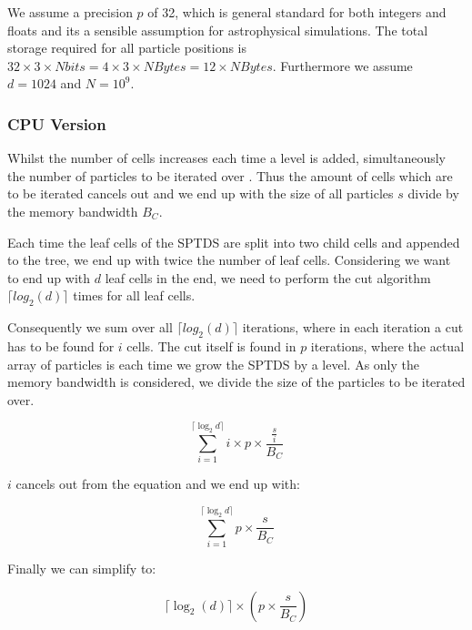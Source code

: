 \documentclass[]{article}
\begin{document}
We assume a precision $p$ of 32, which is general standard for both integers and floats and its a sensible assumption for astrophysical simulations. The total storage required for all particle positions is $32 \times 3 \times N bits = 4 \times 3 \times N Bytes = 12 \times N Bytes$. Furthermore we assume $d = 1024$ and $N=10^9$.
 
\subsubsection{CPU Version}


Whilst the number of cells increases each time a level is added, simultaneously the number of particles to be iterated over . Thus the amount of cells which are to be iterated cancels out and we end up with the size of all particles $s$ divide by the memory bandwidth $B_C$.  


Each time the leaf cells of the SPTDS are split into two child cells and appended to the tree, we end up with twice the number of leaf cells. Considering we want to end up with $d$ leaf cells in the end, we need to perform the cut algorithm $\lceil log_2(d) \rceil$ times for all leaf cells. 

Consequently we sum over all $\lceil log_2(d) \rceil$ iterations, where in each iteration a cut has to be found for $i$ cells. The cut itself is found in $p$ iterations, where the actual array of particles is each time we grow the SPTDS by a level. As only the memory bandwidth is considered, we divide the size of the particles to be iterated over.

\begin{center}
	\begin{equation}
		\sum_{i=1}^{\lceil \log_2{d} \rceil} i \times p \times  \frac{ \frac{s}{i}}{B_C} 
		\label{eq:cpu1}
	\end{equation}
\end{center}

$i$ cancels out from the equation and we end up with:

\begin{center}
	\begin{equation}
		\sum_{i=1}^{\lceil \log_2{d} \rceil} p \times \frac{s}{B_C} 
		\label{eq:cpu2}
	\end{equation}
\end{center}

Finally we can simplify to:

\begin{center}
	\begin{equation}
		\lceil \log_2(d) \rceil  \times \left ( p \times \frac{ s }{B_{C}} \right )
		\label{eq:cpu}
	\end{equation}
\end{center}
\end{document}
